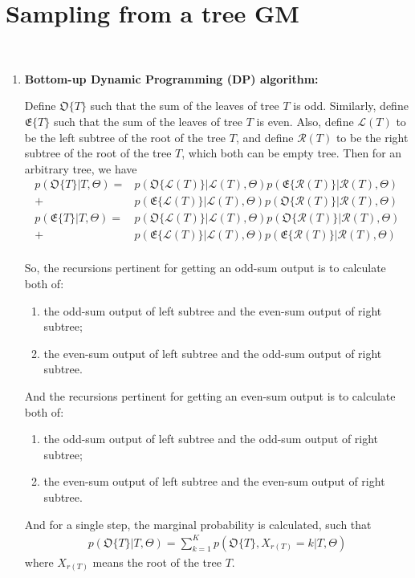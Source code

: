 \documentclass[11pt]{extarticle}
\newcommand{\0}{\mathbf{0}}
\renewcommand{\(}{\left(}
\renewcommand{\)}{\right)}
\theoremstyle{definition}
\begin{document}
\newpage
\section{Sampling from a tree GM}
\noindent{} \\
\begin{enumerate}
\item \textbf{Bottom-up Dynamic Programming (DP) algorithm:}
\par Define $\mathfrak{O}\{T\}$ such that the sum of the leaves of tree $T$ is odd. Similarly, define $\mathfrak{E}\{T\}$ such that the sum of the leaves of tree $T$ is even. Also, define $\mathcal{L}(T)$ to be the left subtree of the root of the tree $T$, and define $\mathcal{R}(T)$ to be the right subtree of the root of the tree $T$, which both can be empty tree. Then for an arbitrary tree, we have
\begin{align*}
	p(\mathfrak{O}\{T\} \vert T, \Theta) =& p(\mathfrak{O}\{\mathcal{L}(T)\} \vert \mathcal{L}(T), \Theta) p(\mathfrak{E}\{\mathcal{R}(T)\} \vert \mathcal{R}(T), \Theta) \\
	+&  p(\mathfrak{E}\{\mathcal{L}(T)\} \vert \mathcal{L}(T), \Theta) p(\mathfrak{O}\{\mathcal{R}(T)\} \vert \mathcal{R}(T), \Theta) \\
	p(\mathfrak{E}\{T\} \vert T, \Theta) =& p(\mathfrak{O}\{\mathcal{L}(T)\} \vert \mathcal{L}(T), \Theta) p(\mathfrak{O}\{\mathcal{R}(T)\} \vert \mathcal{R}(T), \Theta) \\
	+&  p(\mathfrak{E}\{\mathcal{L}(T)\} \vert \mathcal{L}(T), \Theta) p(\mathfrak{E}\{\mathcal{R}(T)\} \vert \mathcal{R}(T), \Theta) \\
\end{align*}
\par So, the recursions pertinent for getting an odd-sum output is to calculate both of: 
\begin{enumerate}[i]
\item the odd-sum output of left subtree and the even-sum output of right subtree;
\item the even-sum output of left subtree and the odd-sum output of right subtree.
\end{enumerate}
\par And the recursions pertinent for getting an even-sum output is to calculate both of:
\begin{enumerate}[i]
\item the odd-sum output of left subtree and the odd-sum output of right subtree;
\item the even-sum output of left subtree and the even-sum output of right subtree.
\end{enumerate}
\par And for a single step, the marginal probability is calculated, such that
\begin{align*}
	p(\mathfrak{O}\{T\} \vert T, \Theta) = \sum_{k=1}^{K} p(\mathfrak{O}\{T\}, X_{r(T)}=k \vert T, \Theta)
\end{align*}
where $X_{r(T)}$ means the root of the tree $T$.


\end{enumerate}
\end{document}
